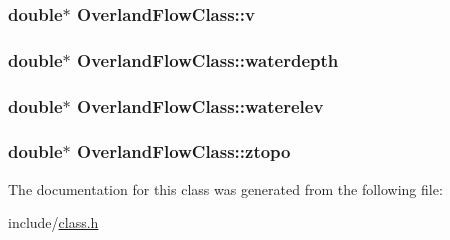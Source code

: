 \subsubsection[{\texorpdfstring{v}{v}}]{\setlength{\rightskip}{0pt plus 5cm}double$\ast$ Overland\+Flow\+Class\+::v}\hypertarget{class_overland_flow_class_a9a93088261b1d6f3c69711d34b6506b3}{}\label{class_overland_flow_class_a9a93088261b1d6f3c69711d34b6506b3}
\subsubsection[{\texorpdfstring{waterdepth}{waterdepth}}]{\setlength{\rightskip}{0pt plus 5cm}double$\ast$ Overland\+Flow\+Class\+::waterdepth}\hypertarget{class_overland_flow_class_aa27e2a9ff30216b25788568271f09b0c}{}\label{class_overland_flow_class_aa27e2a9ff30216b25788568271f09b0c}
\subsubsection[{\texorpdfstring{waterelev}{waterelev}}]{\setlength{\rightskip}{0pt plus 5cm}double$\ast$ Overland\+Flow\+Class\+::waterelev}\hypertarget{class_overland_flow_class_ab1766529cb5c8c0913e0d81a356c9898}{}\label{class_overland_flow_class_ab1766529cb5c8c0913e0d81a356c9898}
\subsubsection[{\texorpdfstring{ztopo}{ztopo}}]{\setlength{\rightskip}{0pt plus 5cm}double$\ast$ Overland\+Flow\+Class\+::ztopo}\hypertarget{class_overland_flow_class_a63cfc55b7070b2f76989c6c2b7b5f9f5}{}\label{class_overland_flow_class_a63cfc55b7070b2f76989c6c2b7b5f9f5}


The documentation for this class was generated from the following file\+:\begin{DoxyCompactItemize}
\item 
include/\hyperlink{class_8h}{class.\+h}\end{DoxyCompactItemize}
